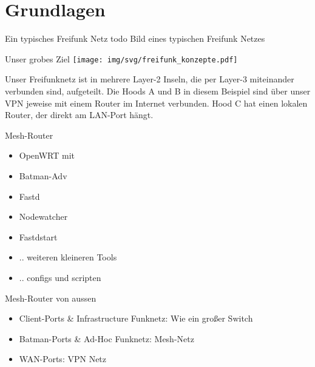 \section{Grundlagen}

\begin{frame}{Ein typisches Freifunk Netz}
    todo Bild eines typischen Freifunk Netzes
\end{frame}

\begin{frame}{Unser grobes Ziel}
    \texttt{[image: img/svg/freifunk\_konzepte.pdf]}

    Unser Freifunknetz ist in mehrere Layer-2 Inseln, die per Layer-3 miteinander verbunden sind,
    aufgeteilt. Die Hoods A und B in diesem Beispiel sind über unser VPN jeweise mit einem Router im
    Internet verbunden. Hood C hat einen lokalen Router, der direkt am LAN-Port hängt.
\end{frame}

\begin{frame}{Mesh-Router}
    \begin{itemize}
        \item OpenWRT mit
        \item Batman-Adv
        \item Fastd
        \item Nodewatcher
        \item Fastdstart
        \item .. weiteren kleineren Tools
        \item .. configs und scripten
    \end{itemize}
\end{frame}

\begin{frame}{Mesh-Router von aussen}
    \begin{itemize}
        \item Client-Ports \& Infrastructure Funknetz:
            Wie ein großer Switch
        \item Batman-Ports \& Ad-Hoc Funknetz:
            Mesh-Netz
        \item WAN-Ports:
            VPN Netz
    \end{itemize}
\end{frame}

